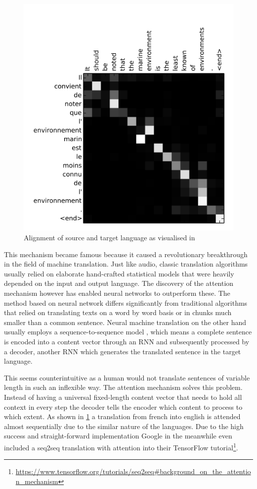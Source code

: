 \begin{figure}
    \centering
	\includegraphics[width=.45\textwidth]{./images/illustrations/attention-bahdanau}
    \caption{Alignment of source and target language as visualised in \cite{DBLP:journals/corr/BahdanauCB14}}
    \label{fig:attention}
\end{figure}
This mechanism became famous because it caused a revolutionary breakthrough in the field of machine translation. Just like audio, classic translation algorithms usually relied on elaborate hand-crafted statistical models that were heavily depended on the input and output language.
The discovery of the attention mechanism however has enabled neural networks to outperform these. The method based on neural network differs significantly from traditional algorithms that relied on translating texts on a word by word basis or in chunks much smaller than a common sentence.
Neural machine translation on the other hand usually employs a sequence-to-sequence model \cite{DBLP:journals/corr/ChoMGBSB14}, which means a complete sentence is encoded into a content vector through an RNN and subsequently processed by a decoder, another RNN which generates the translated sentence in the target language. 

This seems counterintuitive as a human would not translate sentences of variable length in such an inflexible way. The attention mechanism solves this problem. Instead of having a universal fixed-length content vector that needs to hold all context in every step the decoder tells the encoder which content to process to which extent. As shown in \ref{fig:attention} a translation from french into english is attended almost sequentially due to the similar nature of the languages. Due to the high success and straight-forward implementation Google in the meanwhile even included a seq2seq translation with attention into their TensorFlow tutorial\footnote{\url{https://www.tensorflow.org/tutorials/seq2seq\#background_on_the_attention_mechanism}}.


